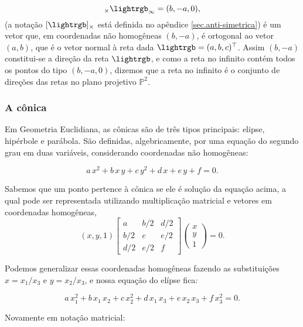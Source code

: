 \begin{equation*}
[\lightrgb]_\times \lightrgb_\infty=(b,-a,0),
\end{equation*}
(a notação $[\lightrgb]_\times$ está definida no apêndice \ref{sec.anti-simetrica}) é um vetor que, em coordenadas não homogêneas $(b,-a)$, é ortogonal ao vetor $(a,b)$, que é o vetor normal à reta dada $\lightrgb=(a,b,c)^\top$. Assim $(b,-a)$ constitui-se a direção da reta $\lightrgb$, e como a reta no infinito contém todos os pontos do tipo $(b,-a,0)$, dizemos que a reta no infinito é o conjunto de direções das retas no plano projetivo $\mathbb{P}^2$.\\

\subsubsection{A cônica}\label{sec.definicao-conica}


Em Geometria Euclidiana, as cônicas são de três tipos principais: elipse, hipérbole e parábola. São definidas, algebricamente, por uma equação do segundo grau em duas variáveis, considerando coordenadas não homogêneas:

\begin{equation*}
a\,x^2+b\,x\,y+c\,y^2+d\,x+e\,y+f=0.
\end{equation*}

Sabemos que um ponto pertence à cônica se ele é solução da equação acima, a qual pode ser representada utilizando multiplicação matricial e vetores em coordenadas homogêneas,
\begin{equation*}
(x,y,1) 
 \begin{bmatrix}
a & b/2 & d/2\\
b/2 & c & e/2\\
d/2 & e/2 & f
\end{bmatrix}
 \begin{pmatrix}
x\\
y\\
1
\end{pmatrix}
 = 0.
\end{equation*}

Podemos generalizar essas coordenadas homogêneas fazendo as substituições $x = x_{1}/x_{3}$ e $y = x_{2}/x_{3}$, e nossa equação do elípse fica:

\begin{equation*}
a\,x_1^2+b\,x_1\,x_2+c\,x_2^2+d\,x_1\,x_3+e\,x_2\,x_3+f\,x_3^2=0.
\end{equation*}

Novamente em notação matricial:

